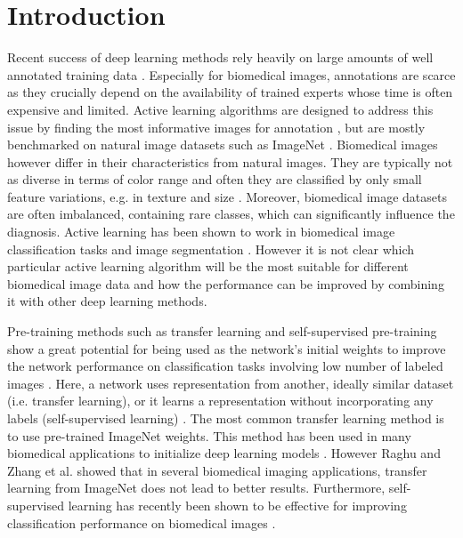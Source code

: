 
\chapter{Introduction}\label{chapter:introduction}
Recent success of deep learning methods rely heavily on large amounts of well annotated training data \cite{sun2017}. Especially for biomedical images, annotations are scarce as they crucially depend on the availability of trained experts whose time is often expensive and limited. Active learning algorithms are designed to address this issue by finding the most informative images for annotation \cite{settles2009, sadafi2019, joshi2009}, but are mostly benchmarked on natural image datasets such as ImageNet \cite{gal2016, ducoffe2015, holub2008}. Biomedical images however differ in their characteristics from natural images. They are typically not as diverse in terms of color range and often they are classified by only small feature variations, e.g. in texture and size \cite{matek2019, esteva2017}. Moreover, biomedical image datasets are often imbalanced, containing rare classes, which can significantly influence the diagnosis. Active learning has been shown to work in biomedical image classification tasks \cite{sadafi2019, smailagic2018} and image segmentation \cite{yang2017}. However it is not clear which particular active learning algorithm will be the most suitable for different biomedical image data and how the performance can be improved by combining it with other deep learning methods.

Pre-training methods such as transfer learning and self-supervised pre-training show a great potential for being used as the network's initial weights to improve the network performance on classification tasks involving low number of labeled images \cite{chen2020, oord2018, newell2020, sagheer2019}. Here, a network uses representation from another, ideally similar dataset (i.e. transfer learning), or it learns a representation without incorporating any labels  (self-supervised learning) \cite{jing2020}. The most common transfer learning method is to use pre-trained ImageNet weights. This method has been used in many biomedical applications to initialize deep learning models \cite{rajpurkar2017, wang2017}. However Raghu and Zhang et al. \cite{raghu2019} showed that in several biomedical imaging applications, transfer learning from ImageNet does not lead to better results. Furthermore, self-supervised learning has recently been shown to be effective for improving classification performance on biomedical images \cite{holmberg2020}. 

